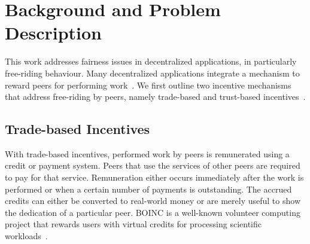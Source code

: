 



\section{Background and Problem Description}
This work addresses fairness issues in decentralized applications, in particularly free-riding behaviour.
Many decentralized applications integrate a mechanism to reward peers for performing work~\cite{ma2004incentive}.
We first outline two incentive mechanisms that address free-riding by peers, namely trade-based and trust-based incentives~\cite{ruffo2007fairpeers}.

\subsection{Trade-based Incentives}
With trade-based incentives, performed work by peers is remunerated using a credit or payment system.
Peers that use the services of other peers are required to pay for that service.
Remuneration either occurs immediately after the work is performed or when a certain number of payments is outstanding.
The accrued credits can either be converted to real-world money or are merely useful to show the dedication of a particular peer.
BOINC is a well-known volunteer computing project that rewards users with virtual credits for processing scientific workloads~\cite{anderson2019boinc}.

